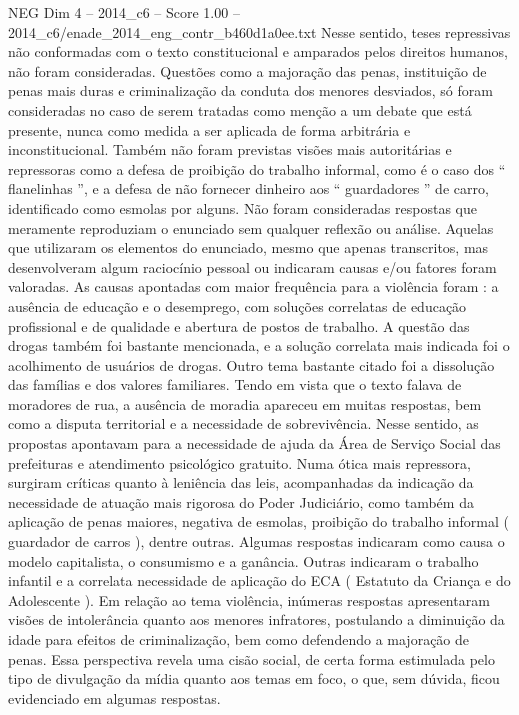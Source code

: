 \begin{textsample}{NEG Dim 4 – 2014\_c6 – Score 1.00 – 2014\_c6/enade\_2014\_eng\_contr\_b460d1a0ee.txt}
Nesse sentido, teses repressivas não conformadas com o texto constitucional e amparados pelos direitos humanos, não foram consideradas.
Questões como a majoração das penas, instituição de penas mais duras e criminalização da conduta dos menores desviados, só foram consideradas no caso de serem tratadas como menção a um debate que está presente, nunca como medida a ser aplicada de forma arbitrária e inconstitucional.
Também não foram previstas visões mais autoritárias e repressoras como a defesa de proibição do trabalho informal, como é o caso dos “ flanelinhas ”, e a defesa de não fornecer dinheiro aos “ guardadores ” de carro, identificado como esmolas por alguns.
Não foram consideradas respostas que meramente reproduziam o enunciado sem qualquer reflexão ou análise.
Aquelas que utilizaram os elementos do enunciado, mesmo que apenas transcritos, mas desenvolveram algum raciocínio pessoal ou indicaram causas e/ou fatores foram valoradas.
As causas apontadas com maior frequência para a violência foram : a ausência de educação e o desemprego, com soluções correlatas de educação profissional e de qualidade e abertura de postos de trabalho.
A questão das drogas também foi bastante mencionada, e a solução correlata mais indicada foi o acolhimento de usuários de drogas.
Outro tema bastante citado foi a dissolução das famílias e dos valores familiares.
Tendo em vista que o texto falava de moradores de rua, a ausência de moradia apareceu em muitas respostas, bem como a disputa territorial e a necessidade de sobrevivência.
Nesse sentido, as propostas apontavam para a necessidade de ajuda da Área de Serviço Social das prefeituras e atendimento psicológico gratuito.
Numa ótica mais repressora, surgiram críticas quanto à leniência das leis, acompanhadas da indicação da necessidade de atuação mais rigorosa do Poder Judiciário, como também da aplicação de penas maiores, negativa de esmolas, proibição do trabalho informal ( guardador de carros ), dentre outras.
Algumas respostas indicaram como causa o modelo capitalista, o consumismo e a ganância.
Outras indicaram o trabalho infantil e a correlata necessidade de aplicação do ECA ( Estatuto da Criança e do Adolescente ).
Em relação ao tema violência, inúmeras respostas apresentaram visões de intolerância quanto aos menores infratores, postulando a diminuição da idade para efeitos de criminalização, bem como defendendo a majoração de penas.
Essa perspectiva revela uma cisão social, de certa forma estimulada pelo tipo de divulgação da mídia quanto aos temas em foco, o que, sem dúvida, ficou evidenciado em algumas respostas.

\end{textsample}
